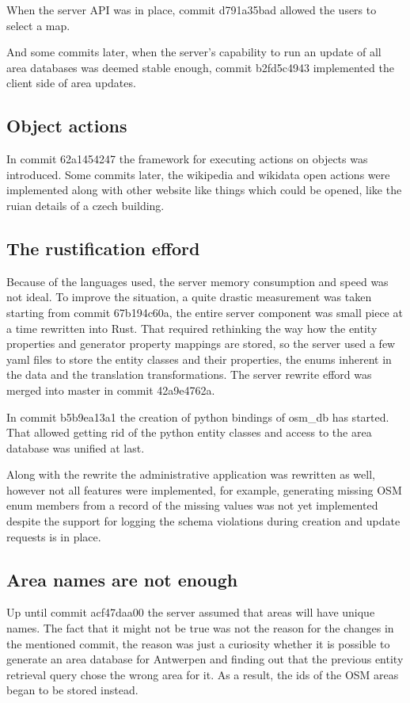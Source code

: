 \documentclass[nolof,digital]{fithesis3}
\begin{document}
When the server API was in place, commit d791a35bad allowed the users to select a map. 

And some commits later, when the server's capability to run an update of all area databases was deemed stable enough, commit b2fd5c4943 implemented the client side of area updates.
\subsection{Object actions}
In commit 62a1454247 the framework for executing actions on objects was introduced. Some commits later, the wikipedia and wikidata open actions were implemented along with other website like things which could be opened, like the ruian details of a czech building.
\subsection{The rustification efford}
Because of the languages used, the server memory consumption and speed was not ideal. To improve the situation, a quite drastic measurement was taken starting from commit 67b194c60a, the entire server component was small piece at a time rewritten into Rust. That required rethinking the way how the entity properties and generator property mappings are stored, so the server used a few yaml files to store the entity classes and their properties, the enums inherent in the data and the translation transformations. The server rewrite efford was merged into master in commit 42a9e4762a.

In commit b5b9ea13a1 the creation of python bindings of osm\_db has started. That allowed getting rid of the python entity classes and access to the area database was unified at last.

Along with the rewrite the administrative application was rewritten as well, however not all features were implemented, for example, generating missing OSM enum members from a record of the missing values was not yet implemented despite the support for logging the schema violations during creation and update requests is in place.
\subsection{Area names are not enough}
Up until commit acf47daa00 the server assumed that areas will have unique names. The fact that it might not be true was not the reason for the changes in the mentioned commit, the reason was just a curiosity whether it is possible to generate an area database for Antwerpen and finding out that the previous entity retrieval query chose the wrong area for it. As a result, the ids of the OSM areas began to be stored instead.
\end{document}
